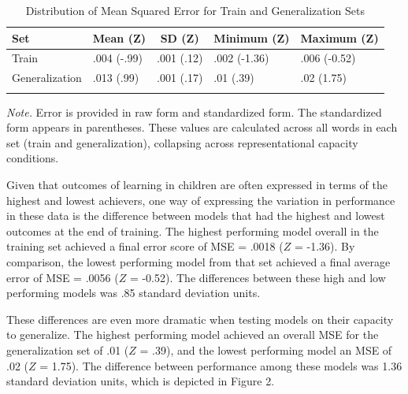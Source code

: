 \documentclass[
  ,man,floatsintext]{apa6}
\begin{document}
\begin{table}[tbp]

\begin{center}
\begin{threeparttable}

\caption{\label{tab:table3}Distribution of Mean Squared Error for Train and Generalization Sets}

\begin{tabular}{lllll}
\toprule
Set & \multicolumn{1}{c}{Mean (Z)} & \multicolumn{1}{c}{SD (Z)} & \multicolumn{1}{c}{Minimum (Z)} & \multicolumn{1}{c}{Maximum (Z)}\\
\midrule
Train & .004 (-.99) & .001 (.12) & .002 (-1.36) & .006 (-0.52)\\
Generalization & .013 (.99) & .001 (.17) & .01 (.39) & .02 (1.75)\\
\bottomrule
\addlinespace
\end{tabular}

\begin{tablenotes}[para]
\normalsize{\textit{Note.} Error is provided in raw form and standardized form. The standardized form appears in parentheses. These values are calculated across all words in each set (train and generalization), collapsing across representational capacity conditions.}
\end{tablenotes}

\end{threeparttable}
\end{center}

\end{table}

Given that outcomes of learning in children are often expressed in terms of the highest and lowest achievers, one way of expressing the variation in performance in these data is the difference between models that had the highest and lowest outcomes at the end of training. The highest performing model overall in the training set achieved a final error score of MSE = .0018 (\(Z\) = -1.36). By comparison, the lowest performing model from that set achieved a final average error of MSE = .0056 (\(Z\) = -0.52). The differences between these high and low performing models was .85 standard deviation units.

These differences are even more dramatic when testing models on their capacity to generalize. The highest performing model achieved an overall MSE for the generalization set of .01 (\(Z\) = .39), and the lowest performing model an MSE of .02 (\(Z\) = 1.75). The difference between performance among these models was 1.36 standard deviation units, which is depicted in Figure 2.
\end{document}
